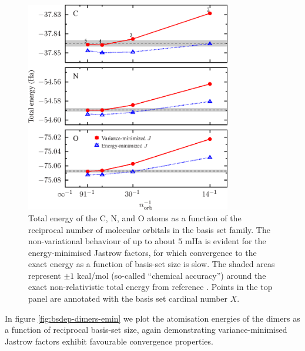 \begin{figure}[htbp]
    \centering
    \includegraphics[width=0.8\textwidth]{figures/optimisation/Fig/bsdep-atoms-emin}
    \caption{Total energy of the C, N, and O atoms as a function of the reciprocal number of molecular orbitals in the  basis set family. The non-variational behaviour of up to about $5$ mHa is evident for the energy-minimised Jastrow factors, for which convergence to the exact energy as a function of basis-set size is slow. The shaded areas represent $\pm 1$ kcal/mol (so-called ``chemical accuracy'') around the exact non-relativistic total energy from reference . Points in the top panel are annotated with the basis set cardinal number $X$.}
    \label{fig:bsdep-atoms-emin}
\end{figure}

In figure \ref{fig:bsdep-dimers-emin} we plot the atomisation energies of the dimers as a function of reciprocal basis-set size, again demonstrating variance-minimised Jastrow factors exhibit favourable convergence properties.

